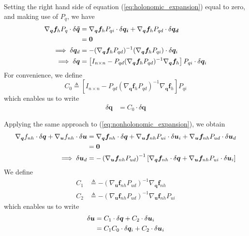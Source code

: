 \documentclass{svjour3}                     %
\begin{document}
Setting the right hand side of equation (\ref{eq:holonomic_expansion}) equal to
zero, and making use of $P_q$, we have
\begin{align}
  \nabla_{\bm{q}}\bm{f}_{h} P_{q} \cdot \delta \bm{\tilde{q}} &=
  \nabla_{\bm{q}}\bm{f}_{h} P_{qi} \cdot \delta \bm{q_i} +
  \nabla_{\bm{q}}\bm{f}_{h} P_{qd} \cdot \delta \bm{q_d}\notag\\
  &= \bm{0}\notag\\
  \implies \delta \bm{q}_d &= -(\nabla_{\bm{q}}\bm{f}_{h} P_{qd})^{-1}
  (\nabla_{\bm{q}}\bm{f}_{h} P_{qi}) \cdot \delta \bm{q}_i \notag\\
  \implies \delta \bm{q} &= \left[ I_{n \times n} - P_{qd}(\nabla_{\bm{q}}
    \bm{f}_{h} P_{qd})^{-1} \nabla_{\bm{q}} \bm{f}_{h} \right] P_{qi} \cdot \delta
    \bm{q}_i
\end{align}
For convenience, we define
\begin{equation}
  \label{eq:C_0}
  C_0 \triangleq \left[ I_{n \times n} - P_{qd}(\nabla_{\bm{q}}
    \bm{f}_{h} P_{qd})^{-1} \nabla_{\bm{q}} \bm{f}_{h} \right] P_{qi}
\end{equation}
which enables us to write
\begin{align}
  \label{eq:delta_q}
  \delta \bm{q} &= C_0 \cdot \delta \bm{q}
\end{align}

Applying the same approach to (\ref{eq:nonholonomic_expansion}), we obtain
\begin{align}
\nabla_{\bm{q}}f_{nh} \cdot \delta \bm{q} +
\nabla_{\bm{u}}f_{nh} \cdot \delta \bm{u} &= \nabla_{\bm{q}} \bm{f}_{nh} \cdot
\delta \bm{q} + \nabla_{\bm{u}} \bm{f}_{nh} P_{ui} \cdot \delta \bm{u}_i +
\nabla_{\bm{u}} \bm{f}_{nh} P_{ud} \cdot \delta \bm{u}_d \notag\\
&= \bm{0}\notag\\
\implies \delta \bm{u}_d &= -\left(\nabla_{\bm{u}} \bm{f}_{nh}
P_{ud}\right)^{-1}\left[\nabla_{\bm{q}}\bm{f}_{nh} \cdot \delta\bm{q} +
  \nabla_{\bm{u}} \bm{f}_{nh} P_{ui} \cdot \delta \bm{u}_i \right]\notag
\end{align}
We define
\begin{align}
  \label{eq:C_1}
  C_1 &\triangleq -\left(\nabla_{\bm{u}} \bm{f}_{nh} P_{ud}\right)^{-1}
  \nabla_{\bm{q}}\bm{f}_{nh} \\
  \label{eq:C_2}
  C_2 &\triangleq -\left(\nabla_{\bm{u}} \bm{f}_{nh} P_{ud}\right)^{-1} \nabla_{\bm{u}} \bm{f}_{nh} P_{ui}
\end{align}
which enables us to write
\begin{align}
  \label{eq:delta_u}
  \delta \bm{u} &= C_1 \cdot \delta \bm{q} + C_2 \cdot \delta \bm{u}_i\notag\\
  &= C_1 C_0 \cdot \delta \bm{q}_i + C_2 \cdot \delta \bm{u}_i
\end{align}
\end{document}
